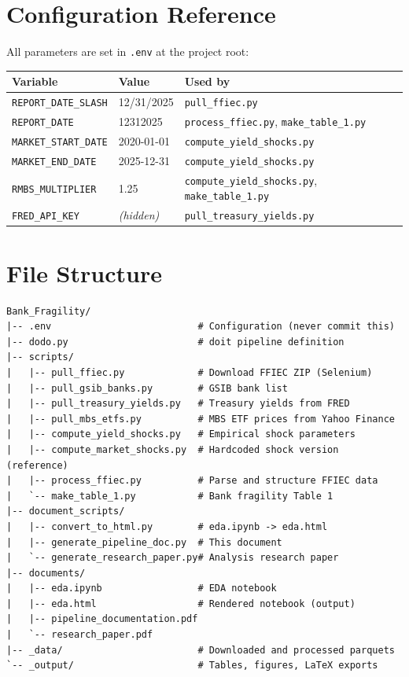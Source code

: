 \documentclass[12pt, a4paper]{article}
\begin{document}
\section{Configuration Reference}

All parameters are set in \texttt{.env} at the project root:

\begin{center}
\begin{tabular}{lll}
\toprule
Variable & Value & Used by \\
\midrule
\texttt{REPORT\_DATE\_SLASH} & 12/31/2025 & \texttt{pull\_ffiec.py} \\
\texttt{REPORT\_DATE}        & 12312025     & \texttt{process\_ffiec.py}, \texttt{make\_table\_1.py} \\
\texttt{MARKET\_START\_DATE} & 2020-01-01 & \texttt{compute\_yield\_shocks.py} \\
\texttt{MARKET\_END\_DATE}   & 2025-12-31   & \texttt{compute\_yield\_shocks.py} \\
\texttt{RMBS\_MULTIPLIER}    & 1.25   & \texttt{compute\_yield\_shocks.py}, \texttt{make\_table\_1.py} \\
\texttt{FRED\_API\_KEY}      & \textit{(hidden)} & \texttt{pull\_treasury\_yields.py} \\
\bottomrule
\end{tabular}
\end{center}

\section{File Structure}

\begin{lstlisting}
Bank_Fragility/
|-- .env                          # Configuration (never commit this)
|-- dodo.py                       # doit pipeline definition
|-- scripts/
|   |-- pull_ffiec.py             # Download FFIEC ZIP (Selenium)
|   |-- pull_gsib_banks.py        # GSIB bank list
|   |-- pull_treasury_yields.py   # Treasury yields from FRED
|   |-- pull_mbs_etfs.py          # MBS ETF prices from Yahoo Finance
|   |-- compute_yield_shocks.py   # Empirical shock parameters
|   |-- compute_market_shocks.py  # Hardcoded shock version (reference)
|   |-- process_ffiec.py          # Parse and structure FFIEC data
|   `-- make_table_1.py           # Bank fragility Table 1
|-- document_scripts/
|   |-- convert_to_html.py        # eda.ipynb -> eda.html
|   |-- generate_pipeline_doc.py  # This document
|   `-- generate_research_paper.py# Analysis research paper
|-- documents/
|   |-- eda.ipynb                 # EDA notebook
|   |-- eda.html                  # Rendered notebook (output)
|   |-- pipeline_documentation.pdf
|   `-- research_paper.pdf
|-- _data/                        # Downloaded and processed parquets
`-- _output/                      # Tables, figures, LaTeX exports
\end{lstlisting}
\end{document}
